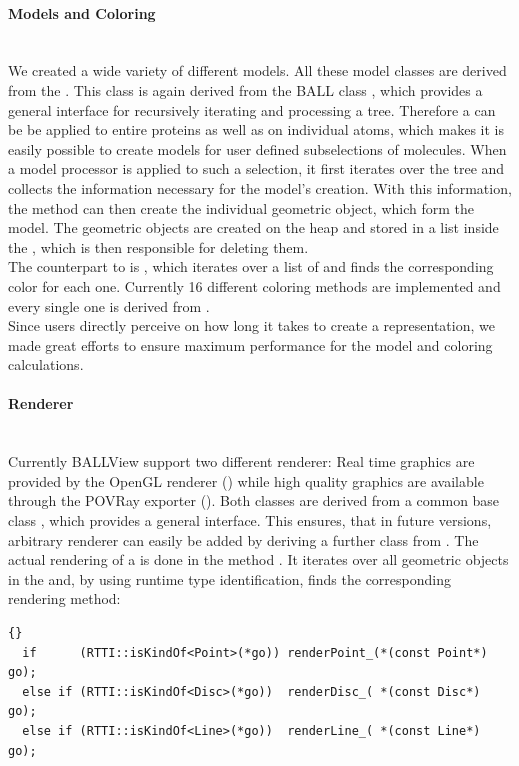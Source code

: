 \paragraph{Models and Coloring}
\hspace*{\fill}\\
We created a wide variety of different models.
All these model classes are derived from the .
This class is again derived from the BALL class , 
which provides a general interface for recursively iterating and processing a 
 tree.
Therefore a  can be be applied to entire proteins as well as on 
individual atoms, which makes it is easily possible to create models for user defined 
subselections of molecules.
When a model processor is applied to such a selection, it first iterates over the
 tree and collects the information necessary for the model's creation.
With this information, the method  can then create the 
individual geometric object, which form the model. 
The geometric objects are created on the heap and stored in a list inside the 
, which is then responsible for deleting them.
\\
The counterpart to  is , which iterates over a 
list of  and finds the corresponding color for each one.
Currently 16 different coloring methods are implemented and
every single one is derived from .
\\
Since users directly perceive on how long it takes to create a representation,
we made great efforts to ensure maximum performance for the model and coloring 
calculations.

\paragraph{Renderer}\label{renderer}
\hspace*{\fill}\\
Currently BALLView support two different renderer: Real time graphics are provided by the
OpenGL renderer () while high quality graphics are available through the 
POVRay exporter ().
Both classes are derived from a common base class , which provides a general 
interface.
This ensures, that in future versions, arbitrary renderer can easily be added by
deriving a further class from .
The actual rendering of a  is done in the method
.
It iterates over all geometric objects in the  and,
by using runtime type identification, finds the corresponding rendering method:
\begin{lstlisting}{}
  if      (RTTI::isKindOf<Point>(*go)) renderPoint_(*(const Point*) go);
  else if (RTTI::isKindOf<Disc>(*go))  renderDisc_( *(const Disc*)  go);
  else if (RTTI::isKindOf<Line>(*go))  renderLine_( *(const Line*)  go);
\end{lstlisting}
 
